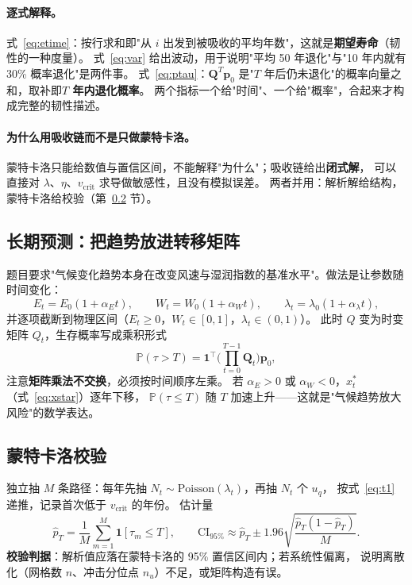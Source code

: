 \documentclass[11pt,a4paper]{ctexart}
\newcommand{\Prob}{\mathbb{P}}
\newcommand{\ind}[1]{\mathbf{1}\!\left[#1\right]}
\begin{document}
\paragraph{逐式解释。}
式~\eqref{eq:etime}：按行求和即"从 $i$ 出发到被吸收的平均年数"，这就是\textbf{期望寿命}（韧性的一种度量）。
式~\eqref{eq:var} 给出波动，用于说明"平均 50 年退化"与"10 年内就有 30\% 概率退化"是两件事。
式~\eqref{eq:ptau}：$\bm{Q}^{T}\bm{p}_0$ 是"$T$ 年后仍未退化"的概率向量之和，取补即\textbf{$T$ 年内退化概率}。
两个指标一个给"时间"、一个给"概率"，合起来才构成完整的韧性描述。

\paragraph{为什么用吸收链而不是只做蒙特卡洛。}
蒙特卡洛只能给数值与置信区间，不能解释"为什么"；吸收链给出\textbf{闭式解}，
可以直接对 $\lambda$、$\eta$、$v_{\mathrm{crit}}$ 求导做敏感性，且没有模拟误差。
两者并用：解析解给结构，蒙特卡洛给校验（第~\ref{sec:mc} 节）。

\subsection{长期预测：把趋势放进转移矩阵}

题目要求"气候变化趋势本身在改变风速与湿润指数的基准水平"。做法是让参数随时间变化：
\begin{equation}\label{eq:trend}
E_t=E_0(1+\alpha_E t),\qquad
W_t=W_0(1+\alpha_W t),\qquad
\lambda_t=\lambda_0(1+\alpha_\lambda t),
\end{equation}
并逐项截断到物理区间（$E_t\ge0$，$W_t\in[0,1]$，$\lambda_t\in(0,1)$）。
此时 $Q$ 变为时变矩阵 $Q_t$，生存概率写成乘积形式
\begin{equation}\label{eq:tv}
\Prob(\tau>T)=\bm{1}^{\top}\Big(\prod_{t=0}^{T-1}\bm{Q}_t\Big)\bm{p}_0 ,
\end{equation}
注意\textbf{矩阵乘法不交换}，必须按时间顺序左乘。
若 $\alpha_E>0$ 或 $\alpha_W<0$，$x^*_t$（式~\eqref{eq:xstar}）逐年下移，
$\Prob(\tau\le T)$ 随 $T$ 加速上升——这就是"气候趋势放大风险"的数学表达。

\subsection{蒙特卡洛校验}\label{sec:mc}

独立抽 $M$ 条路径：每年先抽 $N_t\sim\mathrm{Poisson}(\lambda_t)$，再抽 $N_t$ 个 $u_q$，
按式~\eqref{eq:t1} 递推，记录首次低于 $v_{\mathrm{crit}}$ 的年份。
估计量
\begin{equation}\label{eq:mc}
\hat p_T=\frac{1}{M}\sum_{m=1}^{M}\ind{\tau_m\le T},\qquad
\mathrm{CI}_{95\%}\approx\hat p_T\pm1.96\sqrt{\frac{\hat p_T(1-\hat p_T)}{M}} .
\end{equation}
\textbf{校验判据}：解析值应落在蒙特卡洛的 95\% 置信区间内；若系统性偏离，
说明离散化（网格数 $n$、冲击分位点 $n_u$）不足，或矩阵构造有误。
\end{document}
